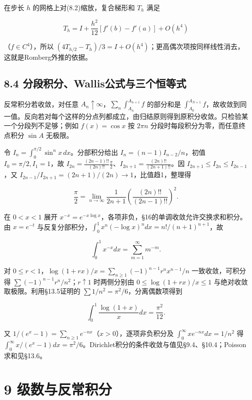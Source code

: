\documentclass[11pt,a4paper]{article}
\begin{document}
在步长 \(h\) 的网格上对(8.2)缩放，复合梯形和 \(T_h\) 满足

\[
T_h=I+\frac{h^2}{12}[f'(b)-f'(a)]+O(h^4)
\]

（\(f\in C^4\)），所以
\((4T_{h/2}-T_h)/3=I+O(h^4)\)；更高偶次项按同样线性消去，这就是Romberg外推的依据。

\subsection{8.4
分段积分、Wallis公式与三个恒等式}\label{ux5206ux6bb5ux79efux5206wallisux516cux5f0fux4e0eux4e09ux4e2aux6052ux7b49ux5f0f}

反常积分若收敛，对任意
\(A_n\uparrow\infty\)，\(\sum_n\int_{A_n}^{A_{n+1}}f\) 的部分和是
\(\int_{A_0}^{A_{N+1}}f\)，故收敛到同一值。反向若对每个这样的分点列都成立，由归结原则得到原积分收敛。只检验某一个分段列不足够；例如
\(f(x)=\cos x\) 按 \(2\pi n\) 分段时每段积分为零，而任意终点积分
\(\sin A\) 无极限。

令 \(I_n=\int_0^{\pi/2}\sin^nx\,dx\)。分部积分给出
\(I_n=(n-1)I_{n-2}/n\)，初值 \(I_0=\pi/2,I_1=1\)，故
\(I_{2n}=\frac{(2n-1)!!}{(2n)!!}\frac\pi2\)、\(I_{2n+1}=\frac{(2n)!!}{(2n+1)!!}\)。因
\(I_{2n+1}\le I_{2n}\le I_{2n-1}\)，又
\(I_{2n-1}/I_{2n+1}=(2n+1)/(2n)\to1\)，比值趋1，整理得

\[
\frac\pi2=\lim_{n\to\infty}\frac1{2n+1}
\left(\frac{(2n)!!}{(2n-1)!!}\right)^2.\tag{8.4}
\]

在 \(0<x<1\) 展开
\(x^{-x}=e^{-x\log x}\)，各项非负，§16的单调收敛允许交换求和积分。由
\(x=e^{-t}\)
与反复分部积分，\(\int_0^1x^n(-\log x)^n dx=n!/(n+1)^{n+1}\)，故

\[
\int_0^1x^{-x}dx=\sum_{m=1}^\infty m^{-m}.\tag{8.5}
\]

对 \(0\le r<1\)，\(\log(1+rx)/x=\sum_{n\ge1}(-1)^{n-1}r^nx^{n-1}/n\)
一致收敛，可积分得 \(\sum(-1)^{n-1}r^n/n^2\)；\(r\uparrow1\)
时两侧分别由 \(0\le\log(1+rx)/x\le1\) 与绝对收敛取极限。利用§13.5证明的
\(\sum1/n^2=\pi^2/6\)，分离偶数项得到

\[
\int_0^1\frac{\log(1+x)}x dx=\frac{\pi^2}{12}.
\]

又 \(1/(e^x-1)=\sum_{n\ge1}e^{-nx}\)（\(x>0\)），逐项非负积分及
\(\int_0^\infty xe^{-nx}dx=1/n^2\) 得
\(\int_0^\infty x/(e^x-1)dx=\pi^2/6\)。Dirichlet积分的条件收敛与值见§9.4、§10.4；Poisson求和见§13.6。

\clearpage

\section{9
级数与反常积分}\label{ux7ea7ux6570ux4e0eux53cdux5e38ux79efux5206}
\end{document}
